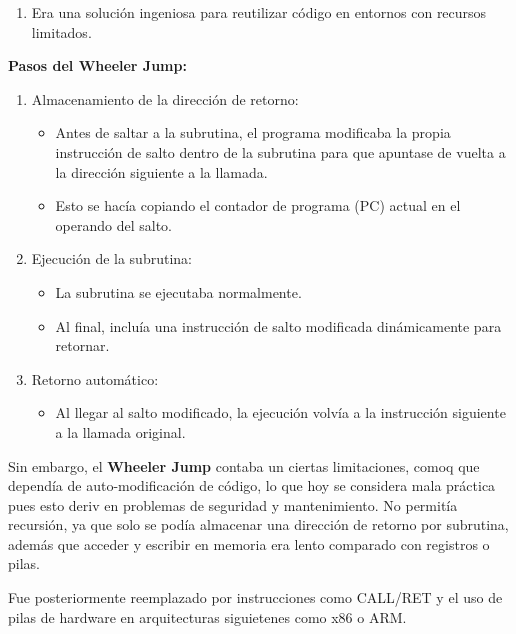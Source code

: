 \documentclass[12pt,letterpaper]{article}
\begin{document}
\begin{enumerate}
\begin{enumerate}[label=\alph*)]
  \item Era una solución ingeniosa para reutilizar código en entornos con recursos limitados.
  \end{enumerate}
  
  \textbf{Pasos del Wheeler Jump:}
  
  \begin{enumerate}[label=\arabic*)]
  \item Almacenamiento de la dirección de retorno:
    
    \begin{itemize}
    \item Antes de saltar a la subrutina, el programa modificaba la propia instrucción de salto dentro de la subrutina para que apuntase de vuelta a la dirección siguiente a la llamada.
      
    \item Esto se hacía copiando el contador de programa (PC) actual en el operando del salto.
    \end{itemize}
    
  \item Ejecución de la subrutina:
    
    \begin{itemize}
    \item La subrutina se ejecutaba normalmente.
    \item Al final, incluía una instrucción de salto modificada dinámicamente para retornar.
    \end{itemize}
    
  \item Retorno automático:
    
    \begin{itemize}
    \item Al llegar al salto modificado, la ejecución volvía a la instrucción siguiente a la llamada original.
    \end{itemize}
    
  \end{enumerate}
  
  Sin embargo, el \textbf{Wheeler Jump} contaba un ciertas limitaciones, comoq que dependía de auto-modificación de código, lo que hoy se considera mala práctica pues esto deriv en problemas de seguridad y mantenimiento. No permitía recursión, ya que solo se podía almacenar una dirección de retorno por subrutina, adem\'{a}s que acceder y escribir en memoria era lento comparado con registros o pilas.
  
  Fue posteriormente reemplazado por instrucciones como CALL/RET y el uso de pilas de hardware en arquitecturas siguietenes como x86 o ARM.
  

\end{enumerate}
\end{document}
